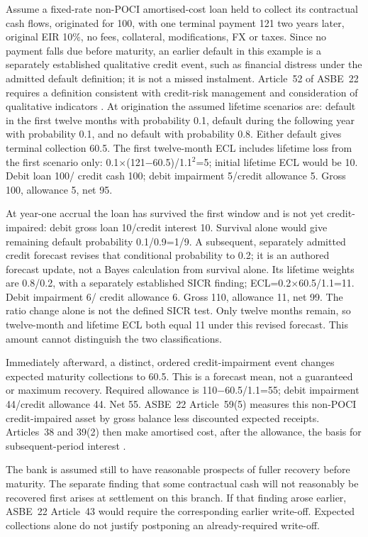 Assume a fixed-rate non-POCI amortised-cost loan held to collect its contractual cash flows, originated for 100, with one terminal payment 121 two years later, original EIR 10\%, no fees, collateral, modifications, FX or taxes. Since no payment falls due before maturity, an earlier default in this example is a separately established qualitative credit event, such as financial distress under the admitted default definition; it is not a missed instalment. Article~52 of ASBE~22 requires a definition consistent with credit-risk management and consideration of qualitative indicators \citep{mofasbe22}. At origination the assumed lifetime scenarios are: default in the first twelve months with probability 0.1, default during the following year with probability 0.1, and no default with probability 0.8. Either default gives terminal collection 60.5. The first twelve-month ECL includes lifetime loss from the first scenario only: 0.1\ensuremath{\times}(121\ensuremath{-}60.5)/1.1\ensuremath{^2}=5; initial lifetime ECL would be 10. Debit loan 100/ credit cash 100; debit impairment 5/credit allowance 5. Gross 100, allowance 5, net 95.

\enlargethispage{\baselineskip}
At year-one accrual the loan has survived the first window and is not yet credit-impaired: debit gross loan 10/credit interest 10. Survival alone would give remaining default probability 0.1/0.9=1/9. A subsequent, separately admitted credit forecast revises that conditional probability to 0.2; it is an authored forecast update, not a Bayes calculation from survival alone. Its lifetime weights are 0.8/0.2, with a separately established SICR finding; ECL=0.2\ensuremath{\times}60.5/1.1=11. Debit impairment 6/ credit allowance 6. Gross 110, allowance 11, net 99. The ratio change alone is not the defined SICR test. Only twelve months remain, so twelve-month and lifetime ECL both equal 11 under this revised forecast. This amount cannot distinguish the two classifications.

Immediately afterward, a distinct, ordered credit-impairment event changes expected maturity collections to 60.5. This is a forecast mean, not a guaranteed or maximum recovery. Required allowance is 110\ensuremath{-}60.5/1.1=55; debit impairment 44/credit allowance 44. Net 55. ASBE~22 Article~59(5) measures this non-POCI credit-impaired asset by gross balance less discounted expected receipts. Articles~38 and 39(2) then make amortised cost, after the allowance, the basis for subsequent-period interest \citep{mofasbe22}.

The bank is assumed still to have reasonable prospects of fuller recovery before maturity. The separate finding that some contractual cash will not reasonably be recovered first arises at settlement on this branch. If that finding arose earlier, ASBE~22 Article~43 would require the corresponding earlier write-off. Expected collections alone do not justify postponing an already-required write-off.

